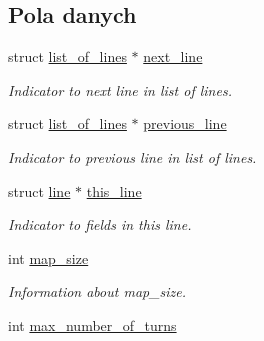 \subsection*{Pola danych}
\begin{DoxyCompactItemize}
\item 
\hypertarget{structlist__of__lines_a7670f224d6f00d0198333a18f3f7c315}{struct \hyperlink{structlist__of__lines}{list\-\_\-of\-\_\-lines} $\ast$ \hyperlink{structlist__of__lines_a7670f224d6f00d0198333a18f3f7c315}{next\-\_\-line}}\label{structlist__of__lines_a7670f224d6f00d0198333a18f3f7c315}

\begin{DoxyCompactList}\small\item\em Indicator to next line in list of lines. \end{DoxyCompactList}\item 
\hypertarget{structlist__of__lines_a483118b9208361c9abaadd6c31c01b4f}{struct \hyperlink{structlist__of__lines}{list\-\_\-of\-\_\-lines} $\ast$ \hyperlink{structlist__of__lines_a483118b9208361c9abaadd6c31c01b4f}{previous\-\_\-line}}\label{structlist__of__lines_a483118b9208361c9abaadd6c31c01b4f}

\begin{DoxyCompactList}\small\item\em Indicator to previous line in list of lines. \end{DoxyCompactList}\item 
\hypertarget{structlist__of__lines_a3e9c87687a25f8afb98fe70ca294bd1c}{struct \hyperlink{structline}{line} $\ast$ \hyperlink{structlist__of__lines_a3e9c87687a25f8afb98fe70ca294bd1c}{this\-\_\-line}}\label{structlist__of__lines_a3e9c87687a25f8afb98fe70ca294bd1c}

\begin{DoxyCompactList}\small\item\em Indicator to fields in this line. \end{DoxyCompactList}\item 
\hypertarget{structlist__of__lines_a422664f6b1fecd50b43a0732624c3686}{int \hyperlink{structlist__of__lines_a422664f6b1fecd50b43a0732624c3686}{map\-\_\-size}}\label{structlist__of__lines_a422664f6b1fecd50b43a0732624c3686}

\begin{DoxyCompactList}\small\item\em Information about map\-\_\-size. \end{DoxyCompactList}\item 
\hypertarget{structlist__of__lines_a978838f8a1d0131c1273c2976d3e7bb8}{int \hyperlink{structlist__of__lines_a978838f8a1d0131c1273c2976d3e7bb8}{max\-\_\-number\-\_\-of\-\_\-turns}}\label{structlist__of__lines_a978838f8a1d0131c1273c2976d3e7bb8}


\end{DoxyCompactItemize}
